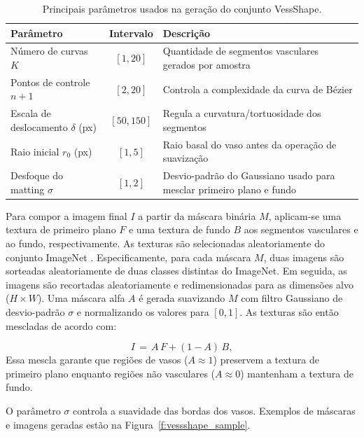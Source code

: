 \documentclass[%
reprint,
nofootinbib,
 amsmath,amssymb,
aps,
floatfix,
superscriptaddress,
showkeys,
longbibliography
]{revtex4-1}
\begin{document}
\begin{table}[t]
\caption{Principais parâmetros usados na geração do conjunto VessShape.}
\label{tab:vessshape_params}
\centering
\begin{tabularx}{\textwidth}{l c X}
\hline
    \textbf{Parâmetro} & \textbf{Intervalo} & \textbf{Descrição} \\
\hline
Número de curvas $K$ & $[1,20]$ & Quantidade de segmentos vasculares gerados por amostra \\
Pontos de controle $n{+}1$ & $[2,20]$ & Controla a complexidade da curva de Bézier \\
Escala de deslocamento $\delta$ (px) & $[50,150]$ & Regula a curvatura/tortuosidade dos segmentos \\
Raio inicial $r_{0}$ (px) & $[1,5]$ & Raio basal do vaso antes da operação de suavização \\
Desfoque do matting $\sigma$ & $[1,2]$ & Desvio-padrão do Gaussiano usado para mesclar primeiro plano e fundo \\

\hline
\end{tabularx}
\end{table}

Para compor a imagem final $I$ a partir da máscara binária $M$, aplicam-se uma textura de primeiro plano $F$ e uma textura de fundo $B$ aos segmentos vasculares e ao fundo, respectivamente. As texturas são selecionadas aleatoriamente do conjunto ImageNet \cite{JiaDeng2009}. Especificamente, para cada máscara $M$, duas imagens são sorteadas aleatoriamente de duas classes distintas do ImageNet. Em seguida, as imagens são recortadas aleatoriamente e redimensionadas para as dimensões alvo ($H \times W$). Uma máscara alfa $A$ é gerada suavizando $M$ com filtro Gaussiano de desvio-padrão $\sigma$ e normalizando os valores para $[0, 1]$. As texturas são então mescladas de acordo com:

\begin{equation}
I \,=\, A\,F + (1-A)\,B,
\label{eq:compose}
\end{equation}
Essa mescla garante que regiões de vasos ($A \approx 1$) preservem a textura de primeiro plano enquanto regiões não vasculares ($A \approx 0$) mantenham a textura de fundo. 

O parâmetro $\sigma$ controla a suavidade das bordas dos vasos. Exemplos de máscaras e imagens geradas estão na Figura~\ref{f:vessshape_sample}.
\end{document}
